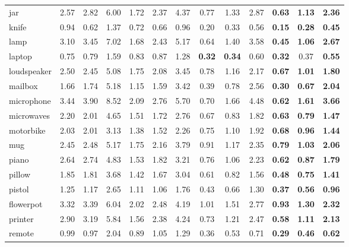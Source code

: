 \begin{table*}[t]
\begin{tabular}{l|ccc|ccc|ccc|ccc}
		jar 		   & 2.57 & 2.82 & 6.00 & 1.72 & 2.37 & 4.37 & 0.77 & 1.33 & 2.87 & \textbf{0.63} & \textbf{1.13} & \textbf{2.36} \\
		knife 		   & 0.94 & 0.62 & 1.37 & 0.72 & 0.66 & 0.96 & 0.20 & 0.33 & 0.56 & \textbf{0.15} & \textbf{0.28} & \textbf{0.45} \\
		lamp 		   & 3.10 & 3.45 & 7.02 & 1.68 & 2.43 & 5.17 & 0.64 & 1.40 & 3.58 & \textbf{0.45} & \textbf{1.06} & \textbf{2.67} \\
		laptop 		   & 0.75 & 0.79 & 1.59 & 0.83 & 0.87 & 1.28 & \textbf{0.32} & \textbf{0.34} & 0.60 & \textbf{0.32} & 0.37 & \textbf{0.55} \\
		loudspeaker    & 2.50 & 2.45 & 5.08 & 1.75 & 2.08 & 3.45 & 0.78 & 1.16 & 2.17 & \textbf{0.67} & \textbf{1.01} & \textbf{1.80} \\
		mailbox 	   & 1.66 & 1.74 & 5.18 & 1.15 & 1.59 & 3.42 & 0.39 & 0.78 & 2.56 & \textbf{0.30} & \textbf{0.67} & \textbf{2.04} \\
		microphone 	   & 3.44 & 3.90 & 8.52 & 2.09 & 2.76 & 5.70 & 0.70 & 1.66 & 4.48 & \textbf{0.62} & \textbf{1.61} & \textbf{3.66} \\
		microwaves 	   & 2.20 & 2.01 & 4.65 & 1.51 & 1.72 & 2.76 & 0.67 & 0.83 & 1.82 & \textbf{0.63} & \textbf{0.79} & \textbf{1.47} \\
		motorbike 	   & 2.03 & 2.01 & 3.13 & 1.38 & 1.52 & 2.26 & 0.75 & 1.10 & 1.92 & \textbf{0.68} & \textbf{0.96} & \textbf{1.44} \\
		mug 		   & 2.45 & 2.48 & 5.17 & 1.75 & 2.16 & 3.79 & 0.91 & 1.17 & 2.35 & \textbf{0.79} & \textbf{1.03} & \textbf{2.06} \\
		piano 		   & 2.64 & 2.74 & 4.83 & 1.53 & 1.82 & 3.21 & 0.76 & 1.06 & 2.23 & \textbf{0.62} & \textbf{0.87} & \textbf{1.79} \\
		pillow 		   & 1.85 & 1.81 & 3.68 & 1.42 & 1.67 & 3.04 & 0.61 & 0.82 & 1.56 & \textbf{0.48} & \textbf{0.75} & \textbf{1.41} \\
		pistol 		   & 1.25 & 1.17 & 2.65 & 1.11 & 1.06 & 1.76 & 0.43 & 0.66 & 1.30 & \textbf{0.37} & \textbf{0.56} & \textbf{0.96} \\
		flowerpot 	   & 3.32 & 3.39 & 6.04 & 2.02 & 2.48 & 4.19 & 1.01 & 1.51 & 2.77 & \textbf{0.93} & \textbf{1.30} & \textbf{2.32} \\
		printer 	   & 2.90 & 3.19 & 5.84 & 1.56 & 2.38 & 4.24 & 0.73 & 1.21 & 2.47 & \textbf{0.58} & \textbf{1.11} & \textbf{2.13} \\
		remote 		   & 0.99 & 0.97 & 2.04 & 0.89 & 1.05 & 1.29 & 0.36 & 0.53 & 0.71 & \textbf{0.29} & \textbf{0.46} & \textbf{0.62} \\

\end{tabular}
\end{table*}
